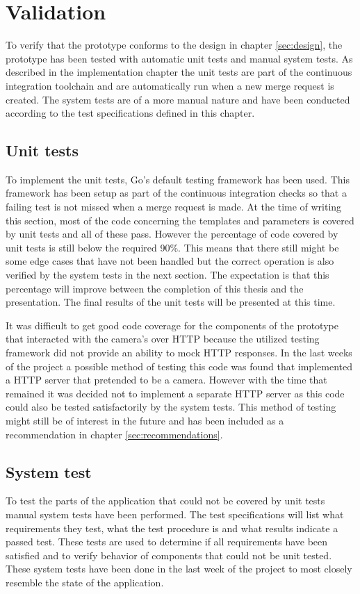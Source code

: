 \chapter{Validation}
\label{sec:validation}
To verify that the prototype conforms to the design in chapter \ref{sec:design}, the prototype has been tested with automatic unit tests and manual system tests.
As described in the implementation chapter the unit tests are part of the continuous integration toolchain and are automatically run when a new merge request is created.
The system tests are of a more manual nature and have been conducted according to the test specifications defined in this chapter.

\section{Unit tests}
To implement the unit tests, Go's default testing framework has been used.
This framework has been setup as part of the continuous integration checks so that a failing test is not missed when a merge request is made.
At the time of writing this section, most of the code concerning the templates and parameters is covered by unit tests and all of these pass.
However the percentage of code covered by unit tests is still below the required 90\%.
This means that there still might be some edge cases that have not been handled but the correct operation is also verified by the system tests in the next section.
The expectation is that this percentage will improve between the completion of this thesis and the presentation.
The final results of the unit tests will be presented at this time.

It was difficult to get good code coverage for the components of the prototype that interacted with the camera's over HTTP because the utilized testing framework did not provide an ability to mock HTTP responses.
In the last weeks of the project a possible method of testing this code was found that implemented a HTTP server that pretended to be a camera.
However with the time that remained it was decided not to implement a separate HTTP server as this code could also be tested satisfactorily by the system tests.
This method of testing might still be of interest in the future and has been included as a recommendation in chapter \ref{sec:recommendations}.

\section{System test}
To test the parts of the application that could not be covered by unit tests manual system tests have been performed.
The test specifications will list what requirements they test, what the test procedure is and what results indicate a passed test.
These tests are used to determine if all requirements have been satisfied and to verify behavior of components that could not be unit tested.
These system tests have been done in the last week of the project to most closely resemble the state of the application.


